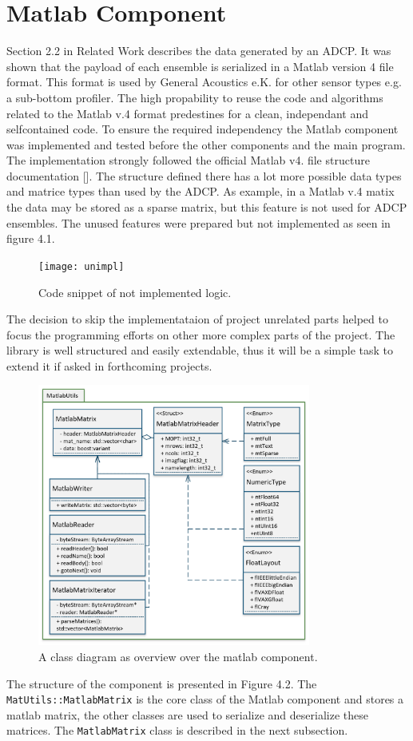 \section{Matlab Component}
Section 2.2 in Related Work describes the data generated by an ADCP. It was shown that the payload of each ensemble is serialized in a Matlab version 4 file format. This format is used by General Acoustics e.K. for other sensor types e.g. a sub-bottom profiler. The high propability to reuse the code and algorithms related to the Matlab v.4 format predestines for a clean, independant and selfcontained code. To ensure the required independency the Matlab component was implemented and tested before the other components and the main program.\\
The implementation strongly followed the official Matlab v4. file structure documentation []. The structure defined there has a lot more possible data types and matrice types than used by the ADCP. As example, in a Matlab v.4 matix the data may be stored as a sparse matrix, but this feature is not used for ADCP ensembles. The unused features were prepared but not implemented as seen in figure 4.1.
\begin{figure}[h]
\centering
      \texttt{[image: unimpl]}
        \caption{Code snippet of not implemented logic.}
\end{figure}
The decision to skip the implementataion of project unrelated parts helped to focus the programming efforts on other more complex parts of the project. The library is well structured and easily extendable, thus it will be a simple task to extend it if asked in forthcoming projects.
\begin{figure}[h]
\centering
      \includegraphics[width=0.8\textwidth]{mlab}
        \caption{A class diagram as overview over the matlab component.}
\end{figure}
The structure of the component is presented in Figure 4.2. The \texttt{MatUtils::MatlabMatrix} is the core class of the Matlab component and stores a matlab matrix, the other classes are used to serialize and deserialize these matrices. The \texttt{MatlabMatrix} class is described in the next subsection.
